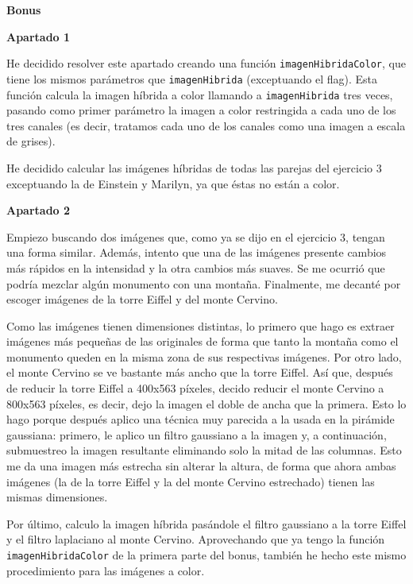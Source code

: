 \documentclass[10pt,a4paper]{article}
\begin{document}
\hfill \break
\hfill \break
\hfill \break
\hfill \break
\textbf{\huge Bonus}
\hfill \break
\begin{list}{•}{}
\item \textbf{\large Apartado 1}

He decidido resolver este apartado creando una función \texttt{imagenHibridaColor}, que tiene los mismos parámetros que \texttt{imagenHibrida} (exceptuando el flag). Esta función calcula la imagen híbrida a color llamando a \texttt{imagenHibrida} tres veces, pasando como primer parámetro la imagen a color restringida a cada uno de los tres canales (es decir, tratamos cada uno de los canales como una imagen a escala de grises).

He decidido calcular las imágenes híbridas de todas las parejas del ejercicio 3 exceptuando la de Einstein y Marilyn, ya que éstas no están a color.

\hfill \break




\item \textbf{\large Apartado 2}

Empiezo buscando dos imágenes que, como ya se dijo en el ejercicio 3, tengan una forma similar. Además, intento que una de las imágenes presente cambios más rápidos en la intensidad y la otra cambios más suaves. Se me ocurrió que podría mezclar algún monumento con una montaña. Finalmente, me decanté por escoger imágenes de la torre Eiffel y del monte Cervino.

Como las imágenes tienen dimensiones distintas, lo primero que hago es extraer imágenes más pequeñas de las originales de forma que tanto la montaña como el monumento queden en la misma zona de sus respectivas imágenes. Por otro lado, el monte Cervino se ve bastante más ancho que la torre Eiffel. Así que, después de reducir la torre Eiffel a 400x563 píxeles, decido reducir el monte Cervino a 800x563 píxeles, es decir, dejo la imagen el doble de ancha que la primera. Esto lo hago porque después aplico una técnica muy parecida a la usada en la pirámide gaussiana: primero, le aplico un filtro gaussiano a la imagen y, a continuación, submuestreo la imagen resultante eliminando solo la mitad de las columnas. Esto me da una imagen más estrecha sin alterar la altura, de forma que ahora ambas imágenes (la de la torre Eiffel y la del monte Cervino estrechado) tienen las mismas dimensiones.

Por último, calculo la imagen híbrida pasándole el filtro gaussiano a la torre Eiffel y el filtro laplaciano al monte Cervino. Aprovechando que ya tengo la función \texttt{imagenHibridaColor} de la primera parte del bonus, también he hecho este mismo procedimiento para las imágenes a color.




\hfill \break

\end{list}
\end{document}
